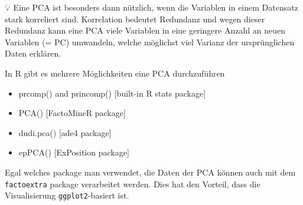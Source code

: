 \documentclass[
]{article}
\providecommand{\tightlist}{%
  \setlength{\itemsep}{0pt}\setlength{\parskip}{0pt}}
\begin{document}
💡 Eine PCA ist besonders dann nützlich, wenn die Variablen in einem Datensatz stark korreliert sind. Korrelation bedeutet Redundanz und wegen dieser Redundanz kann eine PCA viele Variablen in eine geringere Anzahl an neuen Variablen (= PC) umwandeln, welche möglichst viel Varianz der ursprünglichen Daten erklären.

In R gibt es mehrere Möglichkeiten eine PCA durchzuführen

\begin{itemize}
\tightlist
\item
  prcomp() and princomp() {[}built-in R stats package{]}
\item
  PCA() {[}FactoMineR package{]}
\item
  dudi.pca() {[}ade4 package{]}
\item
  epPCA() {[}ExPosition package{]}
\end{itemize}

Egal welches package man verwendet, die Daten der PCA können auch mit dem \texttt{factoextra} package verarbeitet werden. Dies hat den Vorteil, dass die Visualisierung \texttt{ggplot2}-basiert ist.
\end{document}
